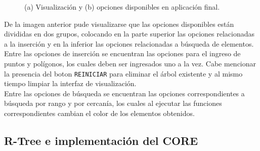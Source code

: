 \documentclass[a4paper]{article}
\begin{document}
\begin{figure}[htbp]
  \begin{minipage}{.5\linewidth}
  \end{minipage}
  \begin{minipage}{.5\linewidth}
  \end{minipage}
  \caption{(a) Visualización y (b) opciones disponibles en aplicación final.}
\label{interface}
\end{figure}

De la imagen anterior pude visualizarse que las opciones disponibles están divididas en dos grupos, colocando en la parte superior las opciones relacionadas a la inserción y en la inferior las opciones relacionadas a búsqueda de elementos.\\
Entre las opciones de inserción se encuentran las opciones para el ingreso de puntos y polígonos, los cuales deben ser ingresados uno a la vez. Cabe mencionar la presencia del boton \texttt{REINICIAR} para eliminar el árbol existente y al mismo tiempo limpiar la interfaz de visualización.\\
Entre las opciones de búsqueda se encuentran las opciones correspondientes a búsqueda por rango y por cercanía, los cuales al ejecutar las funciones correspondientes cambian el color de los elementos obtenidos.\\

\subsection{R-Tree e implementación del CORE}
\end{document}

